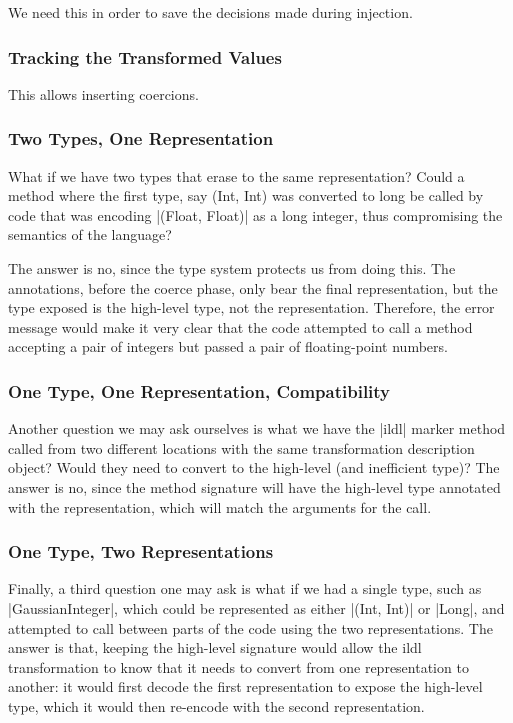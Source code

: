 We need this in order to save the decisions made during injection.

\subsubsection{Tracking the Transformed Values}
This allows inserting coercions.

\subsubsection{Two Types, One Representation}

What if we have two types that erase to the same representation? Could a method where the first type, say (Int, Int) was converted to long be called by code that was encoding |(Float, Float)| as a long integer, thus compromising the semantics of the language?

The answer is no, since the type system protects us from doing this. The annotations, before the coerce phase, only bear the final representation, but the type exposed is the high-level type, not the representation. Therefore, the error message would make it very clear that the code attempted to call a method accepting a pair of integers but passed a pair of floating-point numbers.

\subsubsection{One Type, One Representation, Compatibility}

Another question we may ask ourselves is what we have the |ildl| marker method called from two different locations with the same transformation description object? Would they need to convert to the high-level (and inefficient type)? The answer is no, since the method signature will have the high-level type annotated with the representation, which will match the arguments for the call.

\subsubsection{One Type, Two Representations}

Finally, a third question one may ask is what if we had a single type, such as |GaussianInteger|, which could be represented as either |(Int, Int)| or |Long|, and attempted to call between parts of the code using the two representations. The answer is that, keeping the high-level signature would allow the ildl transformation to know that it needs to convert from one representation to another: it would first decode the first representation to expose the high-level type, which it would then re-encode with the second representation.

